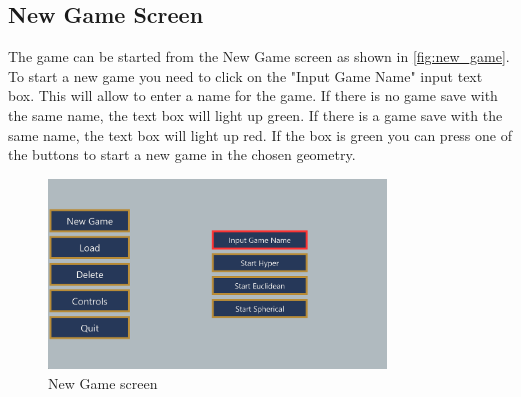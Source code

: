 \subsection{New Game Screen}
The game can be started from the New Game screen  as shown in \autoref{fig:new_game}.
To start a new game you need to click on the "Input Game Name" input text box.
This will allow to enter a name for the game.
If there is no game save with the same name, the text box will light up green.
If there is a game save with the same name, the text box will light up red.
If the box is green you can press one of the buttons to start a new game in the chosen geometry.

\begin{figure}[H]
    \centering
    \includegraphics[width=0.8\textwidth]{sections/user_manual/resources/new-game-no-input.png}
    \caption{New Game screen}
    \label{fig:new_game}
\end{figure}